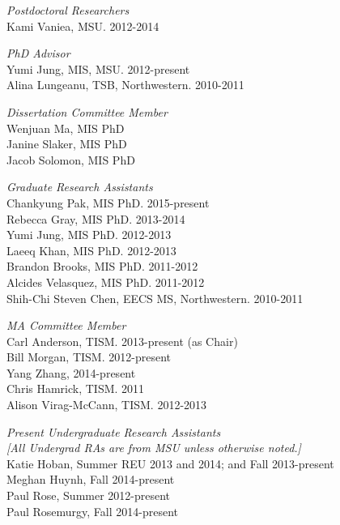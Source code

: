 \documentclass[9pt]{extarticle}
\begin{document}
\emph{Postdoctoral Researchers} \\
Kami Vaniea, MSU. 2012-2014

\emph{PhD Advisor} \\
Yumi Jung, MIS, MSU. 2012-present \\
Alina Lungeanu, TSB, Northwestern. 2010-2011

\emph{Dissertation Committee Member} \\
Wenjuan Ma, MIS PhD \\
Janine Slaker, MIS PhD \\
Jacob Solomon, MIS PhD

\emph{Graduate Research Assistants} \\
Chankyung Pak, MIS PhD. 2015-present \\
Rebecca Gray, MIS PhD. 2013-2014 \\
Yumi Jung, MIS PhD. 2012-2013 \\
Laeeq Khan, MIS PhD. 2012-2013 \\
Brandon Brooks, MIS PhD. 2011-2012 \\
Alcides Velasquez, MIS PhD. 2011-2012 \\
Shih-Chi Steven Chen, EECS MS, Northwestern. 2010-2011

\emph{MA Committee Member} \\
Carl Anderson, TISM. 2013-present (as Chair) \\
Bill Morgan, TISM. 2012-present \\
Yang Zhang, 2014-present \\
Chris Hamrick, TISM. 2011 \\
Alison Virag-McCann, TISM. 2012-2013 


\emph{Present Undergraduate Research Assistants} \\
\footnotesize
\emph{[All Undergrad RAs are from MSU unless otherwise noted.]\\}
\normalsize
Katie Hoban, Summer REU 2013 and 2014; and Fall 2013-present \\
Meghan Huynh, Fall 2014-present \\
Paul Rose, Summer 2012-present \\
Paul Rosemurgy, Fall 2014-present
\end{document}
